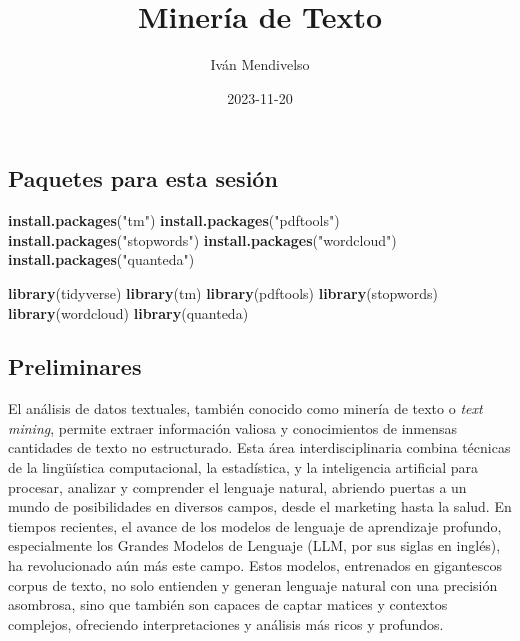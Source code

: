 \documentclass[
]{article}
\title{Minería de Texto}
\author{Iván Mendivelso}
\date{2023-11-20}
\newenvironment{Shaded}{\begin{snugshade}}{\end{snugshade}}
\newcommand{\FunctionTok}[1]{\textcolor[rgb]{0.13,0.29,0.53}{\textbf{#1}}}
\newcommand{\NormalTok}[1]{#1}
\newcommand{\StringTok}[1]{\textcolor[rgb]{0.31,0.60,0.02}{#1}}
\begin{document}
\maketitle

\hypertarget{paquetes-para-esta-sesiuxf3n}{%
\subsection{Paquetes para esta
sesión}\label{paquetes-para-esta-sesiuxf3n}}

\begin{Shaded}
\begin{Highlighting}[]
\FunctionTok{install.packages}\NormalTok{(}\StringTok{"tm"}\NormalTok{)}
\FunctionTok{install.packages}\NormalTok{(}\StringTok{"pdftools"}\NormalTok{)}
\FunctionTok{install.packages}\NormalTok{(}\StringTok{"stopwords"}\NormalTok{)}
\FunctionTok{install.packages}\NormalTok{(}\StringTok{"wordcloud"}\NormalTok{)}
\FunctionTok{install.packages}\NormalTok{(}\StringTok{"quanteda"}\NormalTok{)}
\end{Highlighting}
\end{Shaded}

\begin{Shaded}
\begin{Highlighting}[]
\FunctionTok{library}\NormalTok{(tidyverse)}
\FunctionTok{library}\NormalTok{(tm)}
\FunctionTok{library}\NormalTok{(pdftools)}
\FunctionTok{library}\NormalTok{(stopwords)}
\FunctionTok{library}\NormalTok{(wordcloud)}
\FunctionTok{library}\NormalTok{(quanteda)}
\end{Highlighting}
\end{Shaded}

\hypertarget{preliminares}{%
\subsection{Preliminares}\label{preliminares}}

El análisis de datos textuales, también conocido como minería de texto o
\emph{text mining}, permite extraer información valiosa y conocimientos
de inmensas cantidades de texto no estructurado. Esta área
interdisciplinaria combina técnicas de la lingüística computacional, la
estadística, y la inteligencia artificial para procesar, analizar y
comprender el lenguaje natural, abriendo puertas a un mundo de
posibilidades en diversos campos, desde el marketing hasta la salud. En
tiempos recientes, el avance de los modelos de lenguaje de aprendizaje
profundo, especialmente los Grandes Modelos de Lenguaje (LLM, por sus
siglas en inglés), ha revolucionado aún más este campo. Estos modelos,
entrenados en gigantescos corpus de texto, no solo entienden y generan
lenguaje natural con una precisión asombrosa, sino que también son
capaces de captar matices y contextos complejos, ofreciendo
interpretaciones y análisis más ricos y profundos.
\end{document}
